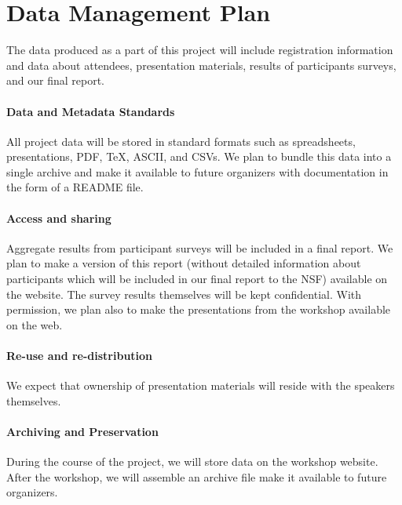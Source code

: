 \documentclass[11pt]{article}
\begin{document}
\newpage

\setcounter{page}{1}

\section*{Data Management Plan}

The data produced as a part of this project will include registration
information and data about attendees, presentation materials, results
of participants surveys, and our final report.

\paragraph*{Data and Metadata Standards}
%
All project data will be stored in standard formats such as
spreadsheets, presentations, PDF, TeX, ASCII, and CSVs. We plan to
bundle this data into a single archive and make it available to future
organizers with documentation in the form of a README file.

\paragraph*{Access and sharing}
%
Aggregate results from participant surveys will be included in a final
report. We plan to make a version of this report (without detailed
information about participants which will be included in our final
report to the NSF) available on the website. The survey results themselves will be
kept confidential. With permission, we plan also to make the
presentations from the workshop available on the web.

\paragraph*{Re-use and re-distribution}
%
We expect that ownership of presentation materials will reside with
the speakers themselves.

\paragraph*{Archiving and Preservation}
%
During the course of the project, we will store data on the workshop
website. After the workshop, we will assemble an archive file make it
available to future organizers.

\newpage

\setcounter{page}{1}

\end{document}

